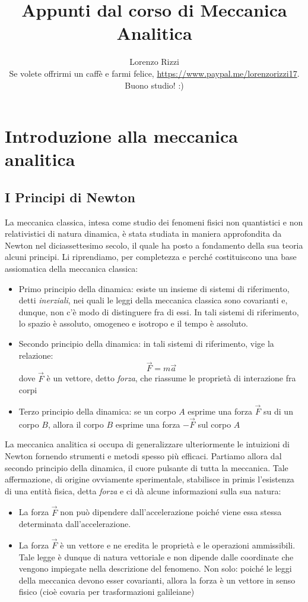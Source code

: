 \documentclass[a4paper,openany]{article}
\title{\textbf{Appunti dal corso di Meccanica Analitica} }
\author{Lorenzo Rizzi
\\
Se volete offrirmi un caffè e farmi felice, \url{https://www.paypal.me/lorenzorizzi17}.\\ Buono studio! :)  }
\begin{document}
	\newpage
	\maketitle
	\newpage
	\tableofcontents
	\section{Introduzione alla meccanica analitica}
	\subsection{I Principi di Newton}
	La meccanica classica, intesa come studio dei fenomeni fisici non quantistici e non relativistici di natura dinamica, è stata studiata in maniera approfondita da Newton nel diciassettesimo secolo, il quale ha posto a fondamento della sua teoria alcuni principi. Li riprendiamo, per completezza e perché costituiscono una base assiomatica della meccanica classica:
	\begin{itemize}
		\item  Primo principio della dinamica: esiste un insieme di sistemi di riferimento, detti \textit{inerziali}, nei quali le leggi della meccanica classica sono covarianti e, dunque, non c'è modo di distinguere fra di essi. In tali sistemi di riferimento, lo spazio è assoluto, omogeneo e isotropo e il tempo è assoluto.
		\item Secondo principio della dinamica: in tali sistemi di riferimento, vige la relazione:
		$$
		\vec{F} = m\vec{a}
		$$
		dove $\vec{F}$ è un vettore, detto \textit{forza}, che riassume le proprietà di interazione fra corpi
		\item Terzo principio della dinamica: se un corpo $A$ esprime una forza $\vec{F}$ su di un corpo $B$, allora il corpo $B$ esprime una forza $-\vec{F}$ sul corpo $A$
	\end{itemize}
	La meccanica analitica si occupa di generalizzare ulteriormente le intuizioni di Newton fornendo strumenti e metodi spesso più efficaci.
	Partiamo allora dal secondo principio della dinamica, il cuore pulsante di tutta la meccanica. Tale affermazione, di origine ovviamente sperimentale, stabilisce in primis l'esistenza di una entità fisica, detta \textit{forza} e ci dà alcune informazioni sulla sua natura:
	\begin{itemize}
		\item La forza $\vec{F}$ non può dipendere dall'accelerazione poiché viene essa stessa determinata dall'accelerazione. 
		\item La forza $\vec{F}$ è un vettore e ne eredita le proprietà e le operazioni ammissibili. Tale legge è dunque di natura vettoriale e non dipende dalle coordinate che vengono impiegate nella descrizione del fenomeno. Non solo: poiché le leggi della meccanica devono esser covarianti, allora la forza è un vettore in senso fisico (cioè covaria per trasformazioni galileiane)	
	\end{itemize}
	
\end{document}

